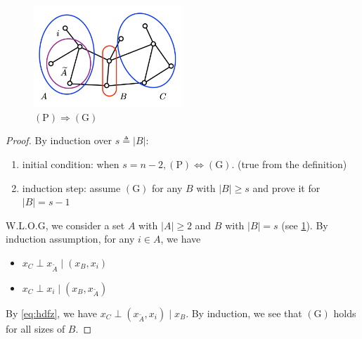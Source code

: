 \documentclass{article}
\begin{document}
\begin{figure}
    \centering
    \includegraphics[width=0.5\textwidth]{Figs/7.png}
    \caption{ $(\mathrm{P}) \Rightarrow(\mathrm{G})$ }
    \label{fig:proofofptog}
\end{figure}
\begin{proof}
By induction over $s \triangleq|B|$:
\begin{enumerate}
    \item initial condition: when $s=n-2,(\mathrm{P}) \Leftrightarrow(\mathrm{G})$. (true from the definition)
    \item induction step:
assume $(\mathrm{G})$ for any $B$ with $|B| \geq s$ and prove it for $|B|=s-1$
\end{enumerate}
W.L.O.G, we consider a set $A$ with $|A| \geq 2$ and $B$ with $|B|=s$ (see \cref{fig:proofofptog}). By induction assumption, for any $i \in A$, we have
\begin{itemize}
    \item $x_{C} \perp x_{\widetilde{A}} \mid\left(x_{B}, x_{i}\right)$
    \item $x_{C} \perp x_{i} \mid\left(x_{B}, x_{\widetilde{A}}\right)$
\end{itemize}
 By  \cref{eq:hdfz}, we have 
    $x_{C} \perp\left(x_{\widetilde{A}}, x_{i}\right) \mid x_{B}$. By induction, we see that $(\mathrm{G})$ holds for all sizes of $B$.
\end{proof}
\end{document}
